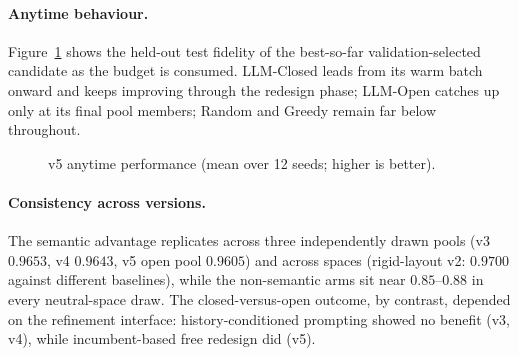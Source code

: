 \documentclass[11pt]{article}
\begin{document}
\paragraph{Anytime behaviour.}
Figure~\ref{fig:qae-anytime} shows the held-out test fidelity of the best-so-far validation-selected candidate as the budget is consumed.
LLM-Closed leads from its warm batch onward and keeps improving through the redesign phase; LLM-Open catches up only at its final pool members; Random and Greedy remain far below throughout.

\begin{figure}[ht]
\centering
{}
\caption{v5 anytime performance (mean over 12 seeds; higher is better).}
\label{fig:qae-anytime}
\end{figure}

\paragraph{Consistency across versions.}
The semantic advantage replicates across three independently drawn pools (v3 $0.9653$, v4 $0.9643$, v5 open pool $0.9605$) and across spaces (rigid-layout v2: $0.9700$ against different baselines), while the non-semantic arms sit near $0.85$--$0.88$ in every neutral-space draw.
The closed-versus-open outcome, by contrast, depended on the refinement interface: history-conditioned prompting showed no benefit (v3, v4), while incumbent-based free redesign did (v5).
\end{document}
